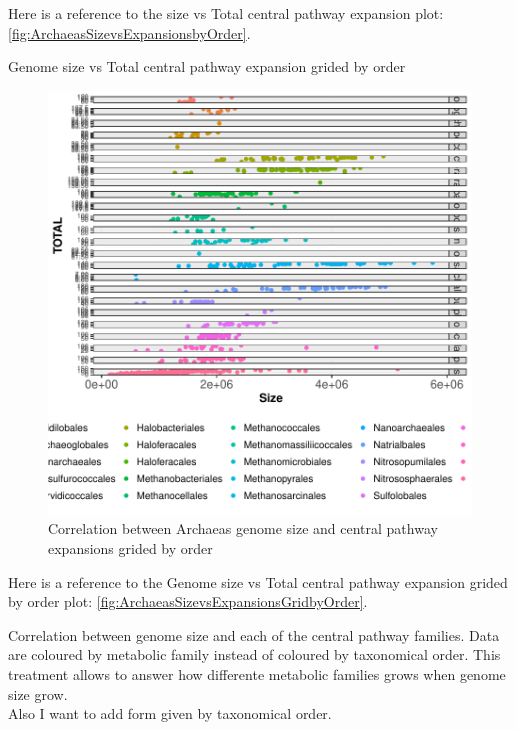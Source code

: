 \documentclass[12pt,twoside]{reedthesis}
\begin{document}
  Here is a reference to the size vs Total central pathway expansion plot:
  \autoref{fig:ArchaeasSizevsExpansionsbyOrder}. \clearpage 
  
  Genome size vs Total central pathway expansion grided by order
  
  \begin{figure}[h!tbp]
  \centering
  \includegraphics[angle = 0,scale = 1]{chapter2/Archaeas/ArchaeasSizevsExpansionsGridbyOrder.pdf}
  \caption[Correlation between Archaeas genome size and central pathway expansions grided by order]{\normalsize{Correlation between Archaeas genome size and central pathway expansions grided by order}}
  \label{fig:ArchaeasSizevsExpansionsGridbyOrder}
  \end{figure}
  
  Here is a reference to the Genome size vs Total central pathway
  expansion grided by order plot:
  \autoref{fig:ArchaeasSizevsExpansionsGridbyOrder}. \clearpage 
  
  Correlation between genome size and each of the central pathway
  families. Data are coloured by metabolic family instead of coloured by
  taxonomical order. This treatment allows to answer how differente
  metabolic families grows when genome size grow.\\
  Also I want to add form given by taxonomical order.
  
\end{document}
